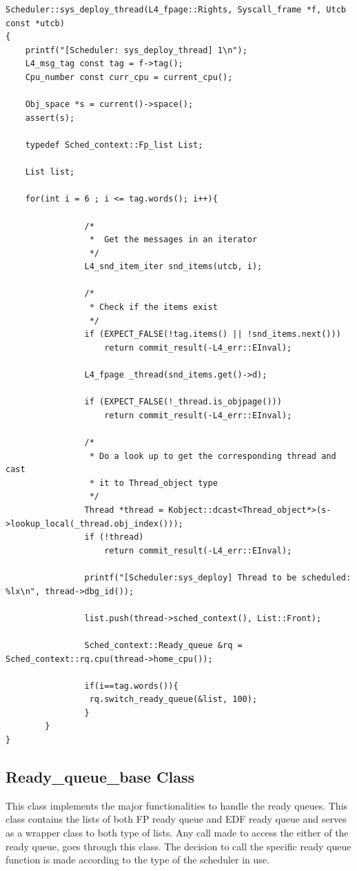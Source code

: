 \begin{lstlisting}[caption={Thread extraction and ready list creation},label=sysdeploycode, style=customcpp]
Scheduler::sys_deploy_thread(L4_fpage::Rights, Syscall_frame *f, Utcb const *utcb)
{
	printf("[Scheduler: sys_deploy_thread] 1\n");
	L4_msg_tag const tag = f->tag();
	Cpu_number const curr_cpu = current_cpu();

	Obj_space *s = current()->space();
	assert(s);

	typedef Sched_context::Fp_list List;

	List list;
	
	for(int i = 6 ; i <= tag.words(); i++){
				
				/*
				 *	Get the messages in an iterator
				 */
				L4_snd_item_iter snd_items(utcb, i);

				/*
				 * Check if the items exist
				 */
				if (EXPECT_FALSE(!tag.items() || !snd_items.next()))
					return commit_result(-L4_err::EInval);

				L4_fpage _thread(snd_items.get()->d);

				if (EXPECT_FALSE(!_thread.is_objpage()))
					return commit_result(-L4_err::EInval);

				/*
				 * Do a look up to get the corresponding thread and cast 
				 * it to Thread_object type
				 */
				Thread *thread = Kobject::dcast<Thread_object*>(s->lookup_local(_thread.obj_index()));
				if (!thread)
					return commit_result(-L4_err::EInval);

				printf("[Scheduler:sys_deploy] Thread to be scheduled: %lx\n", thread->dbg_id());

				list.push(thread->sched_context(), List::Front);

				Sched_context::Ready_queue &rq = Sched_context::rq.cpu(thread->home_cpu());

				if(i==tag.words()){
				 rq.switch_ready_queue(&list, 100);
				}
		}
}
\end{lstlisting}

\subsection{Ready\_queue\_base Class}

This class implements the major functionalities to handle the ready queues. This class contains the lists of both FP ready queue and EDF ready queue and serves as a wrapper class to both type of lists. Any call made to access the either of the ready queue, goes through this class. The decision to call the specific ready queue function is made according to the type of the scheduler in use.

